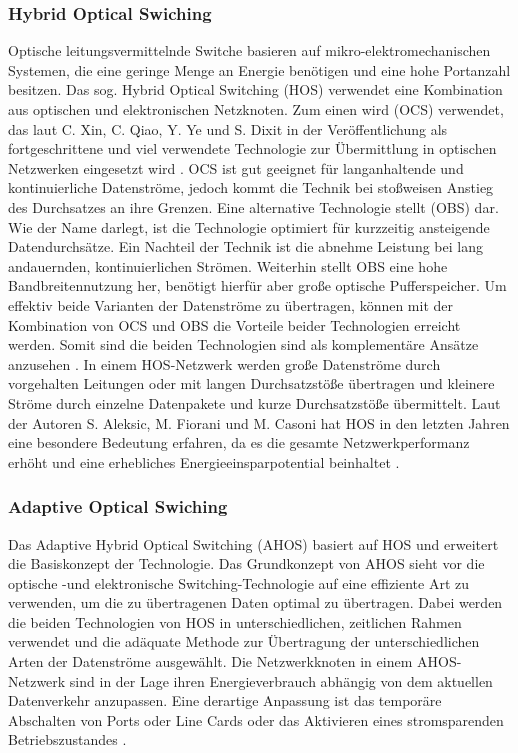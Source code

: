 \subsubsection{Hybrid Optical Swiching}
Optische leitungsvermittelnde Switche basieren auf mikro-elektromechanischen Systemen, die eine geringe Menge an Energie benötigen und eine hohe Portanzahl besitzen. Das sog. Hybrid Optical Switching (HOS) verwendet eine Kombination aus optischen und elektronischen Netzknoten. Zum einen wird  (OCS) verwendet, das laut C. Xin, C. Qiao, Y. Ye und S. Dixit in der Veröffentlichung  als fortgeschrittene und viel verwendete Technologie zur Übermittlung in optischen Netzwerken eingesetzt wird \cite{tsinghua2011}. OCS ist gut geeignet für langanhaltende und kontinuierliche Datenströme, jedoch kommt die Technik bei stoßweisen Anstieg des Durchsatzes an ihre Grenzen. Eine alternative Technologie stellt  (OBS) dar. Wie der Name darlegt, ist die Technologie optimiert für kurzzeitig ansteigende Datendurchsätze. Ein Nachteil der Technik ist die abnehme Leistung bei lang andauernden, kontinuierlichen Strömen. Weiterhin stellt OBS eine hohe Bandbreitennutzung her, benötigt hierfür aber große optische Pufferspeicher. Um effektiv beide Varianten der Datenströme zu übertragen, können mit der Kombination von OCS und OBS die Vorteile beider Technologien erreicht werden. Somit sind die beiden Technologien sind als komplementäre Ansätze anzusehen \cite{tsinghua2011}. In einem HOS-Netzwerk werden große Datenströme durch vorgehalten Leitungen oder mit langen Durchsatzstöße übertragen und kleinere Ströme durch einzelne Datenpakete und kurze Durchsatzstöße übermittelt. Laut der Autoren S. Aleksic, M. Fiorani und M. Casoni hat HOS in den letzten Jahren eine besondere Bedeutung erfahren, da es die gesamte Netzwerkperformanz erhöht und eine erhebliches Energieeinsparpotential beinhaltet \cite{adaptiveHOS}.

\subsubsection{Adaptive Optical Swiching}
Das Adaptive Hybrid Optical Switching (AHOS) basiert auf HOS und erweitert die Basiskonzept der Technologie. Das Grundkonzept von AHOS sieht vor die optische -und elektronische Switching-Technologie auf eine effiziente Art zu verwenden, um die zu übertragenen Daten optimal zu übertragen. Dabei werden die beiden Technologien von HOS in unterschiedlichen, zeitlichen Rahmen verwendet und die adäquate Methode zur Übertragung der unterschiedlichen Arten der Datenströme ausgewählt. Die Netzwerkknoten in einem AHOS-Netzwerk sind in der Lage ihren Energieverbrauch abhängig von dem aktuellen Datenverkehr anzupassen. Eine derartige Anpassung ist das temporäre Abschalten von Ports oder Line Cards oder das Aktivieren eines stromsparenden Betriebszustandes \cite{adaptiveHOS}.
